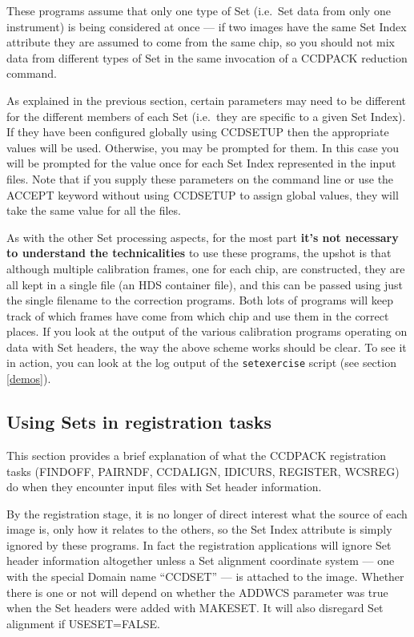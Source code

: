 \documentclass[twoside,11pt]{article}
\newcommand{\htmlref}[2]{#1}
\newcommand{\latexhtml}[2]{#1}
\renewcommand{\_}{\texttt{\symbol{95}}}
\newcommand{\ttsize}{\latexhtml{\small}{}}
\newcommand{\text}[1]{{\ttsize \tt #1}}
\newcommand{\routine}[1]{{\sc #1}}
\newcommand{\xroutine}[1]{\htmlref{{\sc #1}}{#1}}
\begin{document}
These programs assume that only one type of Set 
(i.e.\ Set data from only one instrument) 
is being considered at once --- if two images have the same Set Index
attribute they are assumed to come from the same chip,
so you should not mix data from different types of Set in the same
invocation of a CCDPACK reduction command.

As explained in the previous section, certain parameters may need
to be different for the different members of each Set (i.e.\ they
are specific to a given Set Index).  If they have been configured
globally using \routine{CCDSETUP} then the appropriate values
will be used.  Otherwise, you may be prompted for them.  In this case
you will be prompted for the value once for each Set Index
represented in the input files.  Note that if you supply these 
parameters on the command line or use the ACCEPT keyword without
using \routine{CCDSETUP} to assign global values, they will
take the same value for all the files.

As with the other Set processing aspects, for the most part
{\bf it's not necessary to understand the technicalities} 
to use these programs,
the upshot is that although multiple calibration frames,
one for each chip, are constructed, they are all kept in a single file
(an HDS container file),
and this can be passed using just the single filename
to the correction programs.
Both lots of programs will keep track of which frames have come
from which chip and use them in the correct places.
If you look at the output of the various calibration programs
operating on data with Set headers, the way the 
above scheme works should be clear.  To see it in action, you can
look at the log output of the 
\text{setexercise} script (see section \ref{demos}).


\subsection{Using Sets in registration tasks}

This section provides a brief explanation of what the CCDPACK
registration tasks 
(\xroutine{FINDOFF}, \xroutine{PAIRNDF}, \xroutine{CCDALIGN},
\xroutine{IDICURS}, \xroutine{REGISTER}, \xroutine{WCSREG})
do when they encounter input files with Set header information.

By the registration stage, it is no longer of direct interest
what the source of each image is, only how it relates to the
others, so the Set Index attribute is simply ignored by these programs.
In fact the registration applications will ignore Set header information
altogether unless a Set alignment coordinate system 
--- one with the special Domain name ``CCD\_SET'' ---
is attached to the image.
Whether there is one or not will depend on whether the 
ADDWCS parameter was true when the Set headers were added
with \xroutine{MAKESET}.
It will also disregard Set alignment if USESET=FALSE.
\end{document}

